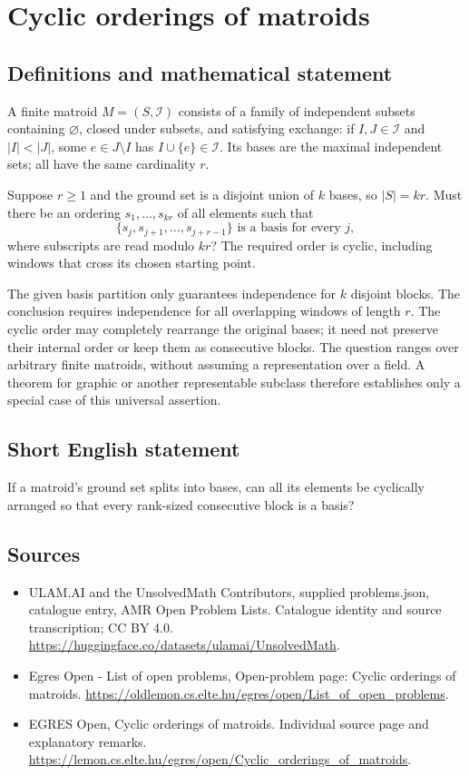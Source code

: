 \documentclass[11pt,a4paper]{article}
\begin{document}
\section*{Cyclic orderings of matroids}\label{statement}

\subsection{Definitions and mathematical statement}
A finite matroid $M=(S,\mathcal I)$ consists of a family of independent
subsets containing $\varnothing$, closed under subsets, and satisfying
exchange: if $I,J\in\mathcal I$ and $|I|<|J|$, some $e\in J\setminus I$
has $I\cup\{e\}\in\mathcal I$. Its bases are the maximal independent
sets; all have the same cardinality $r$.

Suppose $r\ge1$ and the ground set is a disjoint union of $k$ bases,
so $|S|=kr$. Must there be an ordering $s_1,\ldots,s_{kr}$ of all
elements such that
\[
                    \{s_j,s_{j+1},\ldots,s_{j+r-1}\}
                        \text{ is a basis for every }j,
\]
where subscripts are read modulo $kr$?
The required order is cyclic, including windows that cross its chosen
starting point.

The given basis partition only guarantees independence for $k$ disjoint
blocks. The conclusion requires independence for all overlapping
windows of length $r$. The cyclic order may completely rearrange the
original bases; it need not preserve their internal order or keep them
as consecutive blocks. The question ranges over arbitrary finite
matroids, without assuming a representation over a field. A theorem
for graphic or another representable subclass therefore establishes
only a special case of this universal assertion.
\subsection{Short English statement}
If a matroid's ground set splits into bases, can all its elements
be cyclically arranged so that every rank-sized consecutive block is a basis?
\subsection{Sources}
\begin{itemize}
\item[S1] ULAM.AI and the UnsolvedMath Contributors, supplied problems.json, catalogue entry, AMR Open Problem Lists. Catalogue identity and source transcription; CC BY 4.0.
\url{https://huggingface.co/datasets/ulamai/UnsolvedMath}.
\item[S2] Egres Open - List of open problems, Open-problem page: Cyclic orderings of matroids. 
\url{https://oldlemon.cs.elte.hu/egres/open/List_of_open_problems}.
\item[S3] EGRES Open, Cyclic orderings of matroids. Individual source page and explanatory remarks.
\url{https://lemon.cs.elte.hu/egres/open/Cyclic_orderings_of_matroids}.
\end{itemize}
\end{document}
